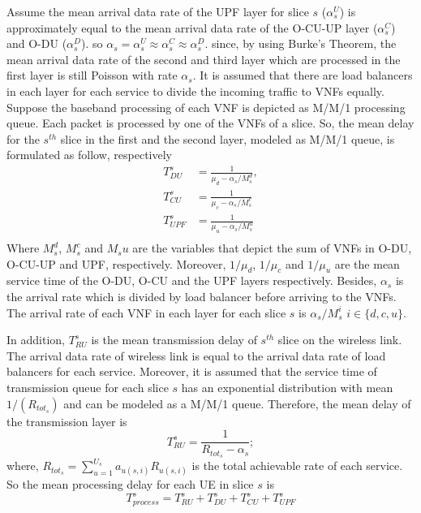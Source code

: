 \documentclass[conference]{IEEEtran}
\begin{document}
Assume the mean arrival data rate of the UPF layer for slice $s$ ($\alpha_{s}^U$) is approximately equal to the mean arrival data rate of the O-CU-UP layer ($\alpha_{s}^C$) and O-DU ($\alpha_{s}^D$). so $\alpha_{s} =\alpha_{s}^U \approx \alpha_{s}^C \approx \alpha_{s}^D$. since, by using Burke’s Theorem, the mean arrival data rate of the second and third layer which are processed in the first layer is still Poisson with rate $\alpha_{s}$.
It is assumed that there are load balancers in each layer for each service to divide the incoming traffic to VNFs equally. %
Suppose the baseband processing of each VNF is depicted as M/M/1 processing queue.
Each packet is processed by one of the VNFs of a slice. So, the mean delay for the $s^{th}$ slice in the first and the second layer, modeled as M/M/1 queue, is formulated as follow, respectively
\begin{equation}
\begin{split}
T_{DU}^{s} &= \frac{1}{\mu_d - \alpha_{s}/{M_s^{d}}},\\
T_{CU}^{s} &= \frac{1}{\mu_c - \alpha_{s}/{M_s^{c}}}\\
T_{UPF}^{s} &= \frac{1}{\mu_u - \alpha_{s}/{M_s^{u}}}\\
\end{split}
\end{equation}
Where $M_s^{d}$, $M_s^{c}$ and 
$M_s{u}$ are the variables that depict the sum of VNFs in O-DU, O-CU-UP and UPF, respectively. 
Moreover, $1/\mu_d$, $1/\mu_c$ and $1/\mu_u$ are the mean service time of the O-DU, O-CU and the UPF layers respectively.
Besides, $\alpha_{s}$ is the  arrival rate which is divided
by load balancer before arriving to the VNFs. The arrival rate of each VNF in each layer for each slice 
$s$ is $\alpha_{s}/{M_s^{i}}$ $ i \in \{d,c, u\}$.

In addition, $T_{RU}^{s}$ is the mean transmission delay of $s^{th}$ slice on the wireless link. The arrival data rate of wireless link is equal to the arrival data rate of load balancers for each service.
Moreover, it is assumed that the service time of transmission queue for each slice $s$ has
 an exponential distribution with mean $1/(R_{{tot}_s})$ and can be modeled as a M/M/1 queue.
 Therefore,
the mean delay of the transmission layer is
\begin{equation}
 T_{RU}^{s} = \frac{1}{R_{{tot}_s} - \alpha_{s}};
\end{equation}
where, $R_{{tot}_s} = \sum_{u=1}^{U_s}a_{u(s,i)}R_{u(s,i)}$ is the total achievable rate of each service.
So the mean processing delay for each UE in slice $s$ is 
\begin{equation}
T_{process}^{s} =  T_{RU}^{s} + T_{DU}^{s} + T_{CU}^{s} + T_{UPF}^{s}
\end{equation}
\end{document}

